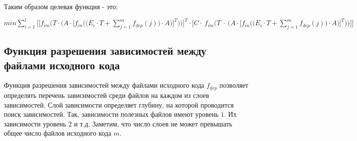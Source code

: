 Таким образом целевая функция - это:
  \begin{center}
    $\displaystyle min \sum^{l}_{i = 1} \Bigg[\Bigg[f_{im}\Bigg(T \cdot \bigg(A \cdot \bigg[f_{in}\Big(\big(E_{i} \cdot T + \sum^{m}_{j = 1}f_{dep}(j)\big) \cdot A\Big)\bigg]^{T}\bigg)\Bigg)\Bigg]^{T} \cdot \Bigg[C \cdot~f_{im}\Bigg(T~\cdot~\bigg(A \cdot \bigg[f_{in}\Big(\big(E_{i} \cdot T + \sum^{m}_{j = 1}f_{dep}(j)\big) \cdot A\Big)\bigg]^{T}\bigg)\Bigg)\Bigg]\Bigg]$
  \end{center}

\subsection*{Функция разрешения зависимостей между файлами исходного кода}
Функция разрешения зависимостей между файлами исходного кода $f_{dep}$ позволяет определять перечень зависимостей среди файлов на каждом из слоев зависимостей. Слой зависимости определяет глубину, на которой проводится поиск зависимостей. Так, зависимости полезных файлов имеют уровень $1$. Их зависимости уровень $2$ и т.д. Заметим, что число слоев не может превышать общее число файлов исходного кода $m$.


